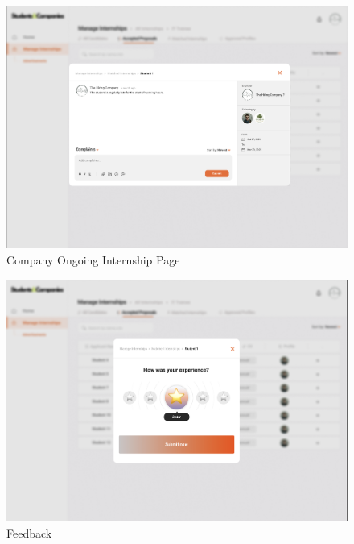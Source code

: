 \documentclass{article}
\begin{document}
\begin{figure}[H]
    \centering
    \includegraphics[scale = 0.42]{figures/UserInterfaces/Company/Complaints.png}
    \caption{Company Ongoing Internship Page}
     \centering
\end{figure}
\begin{figure}[H]
    \centering
    \includegraphics[scale = 0.42]{figures/UserInterfaces/Company/FeedbackCompany.png}
    \caption{Feedback}
     \centering
\end{figure}
\end{document}
